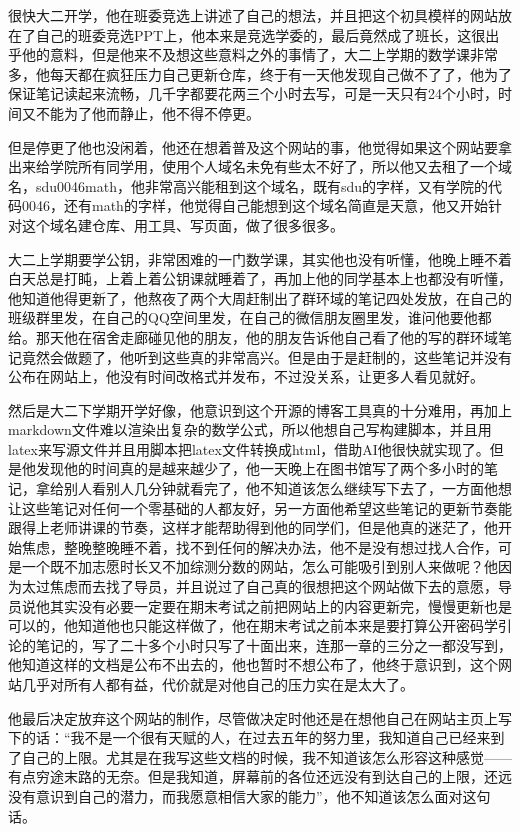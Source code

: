 很快大二开学，他在班委竞选上讲述了自己的想法，并且把这个初具模样的网站放在了自己的班委竞选PPT上，他本来是竞选学委的，最后竟然成了班长，这很出乎他的意料，但是他来不及想这些意料之外的事情了，大二上学期的数学课非常多，他每天都在疯狂压力自己更新仓库，终于有一天他发现自己做不了了，他为了保证笔记读起来流畅，几千字都要花两三个小时去写，可是一天只有24个小时，时间又不能为了他而静止，他不得不停更。

但是停更了他也没闲着，他还在想着普及这个网站的事，他觉得如果这个网站要拿出来给学院所有同学用，使用个人域名未免有些太不好了，所以他又去租了一个域名，sdu0046math，他非常高兴能租到这个域名，既有sdu的字样，又有学院的代码0046，还有math的字样，他觉得自己能想到这个域名简直是天意，他又开始针对这个域名建仓库、用工具、写页面，做了很多很多。

大二上学期要学公钥，非常困难的一门数学课，其实他也没有听懂，他晚上睡不着白天总是打盹，上着上着公钥课就睡着了，再加上他的同学基本上也都没有听懂，他知道他得更新了，他熬夜了两个大周赶制出了群环域的笔记四处发放，在自己的班级群里发，在自己的QQ空间里发，在自己的微信朋友圈里发，谁问他要他都给。那天他在宿舍走廊碰见他的朋友，他的朋友告诉他自己看了他的写的群环域笔记竟然会做题了，他听到这些真的非常高兴。但是由于是赶制的，这些笔记并没有公布在网站上，他没有时间改格式并发布，不过没关系，让更多人看见就好。

然后是大二下学期开学好像，他意识到这个开源的博客工具真的十分难用，再加上markdown文件难以渲染出复杂的数学公式，所以他想自己写构建脚本，并且用latex来写源文件并且用脚本把latex文件转换成html，借助AI他很快就实现了。但是他发现他的时间真的是越来越少了，他一天晚上在图书馆写了两个多小时的笔记，拿给别人看别人几分钟就看完了，他不知道该怎么继续写下去了，一方面他想让这些笔记对任何一个零基础的人都友好，另一方面他希望这些笔记的更新节奏能跟得上老师讲课的节奏，这样才能帮助得到他的同学们，但是他真的迷茫了，他开始焦虑，整晚整晚睡不着，找不到任何的解决办法，他不是没有想过找人合作，可是一个既不加志愿时长又不加综测分数的网站，怎么可能吸引到别人来做呢？他因为太过焦虑而去找了导员，并且说过了自己真的很想把这个网站做下去的意愿，导员说他其实没有必要一定要在期末考试之前把网站上的内容更新完，慢慢更新也是可以的，他知道他也只能这样做了，他在期末考试之前本来是要打算公开密码学引论的笔记的，写了二十多个小时只写了十面出来，连那一章的三分之一都没写到，他知道这样的文档是公布不出去的，他也暂时不想公布了，他终于意识到，这个网站几乎对所有人都有益，代价就是对他自己的压力实在是太大了。

他最后决定放弃这个网站的制作，尽管做决定时他还是在想他自己在网站主页上写下的话：“我不是一个很有天赋的人，在过去五年的努力里，我知道自己已经来到了自己的上限。尤其是在我写这些文档的时候，我不知道该怎么形容这种感觉——有点穷途末路的无奈。但是我知道，屏幕前的各位还远没有到达自己的上限，还远没有意识到自己的潜力，而我愿意相信大家的能力”，他不知道该怎么面对这句话。

